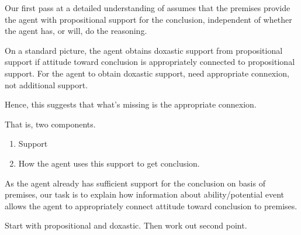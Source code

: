 \begin{note}[Outline]
  Our first pass at a detailed understanding of \WR{} assumes that the premises provide the agent with propositional support for the conclusion, independent of whether the agent has, or will, do the reasoning.

  On a standard picture, the agent obtains doxastic support from propositional support if attitude toward conclusion is appropriately connected to propositional support.
  For the agent to obtain doxastic support, need appropriate connexion, not additional support.

  Hence, this suggests that what's missing is the appropriate connexion.

  That is, two components.
  \begin{enumerate}
  \item Support
  \item How the agent uses this support to get conclusion.
  \end{enumerate}

  As the agent already has sufficient support for the conclusion on basis of premises, our task is to explain how information about ability/potential event allows the agent to appropriately connect attitude toward conclusion to premises.

  Start with propositional and doxastic.
  Then work out second point.
\end{note}

